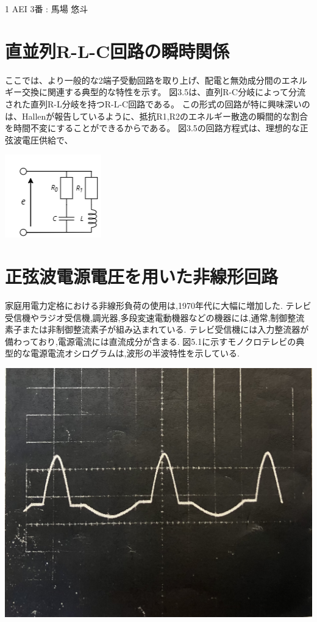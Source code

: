 \documentclass[fleqn,11pt,a4paper,dvipdfmx]{jsarticle}
\begin{document}
%
%
1 AEI 3番 : 馬場 悠斗
\setcounter{section}{2} 
\section{直並列R-L-C回路の瞬時関係}


ここでは、より一般的な2端子受動回路を取り上げ、配電と無効成分間のエネルギー交換に関連する典型的な特性を示す。
図3.5は、直列R-C分岐によって分流された直列R-L分岐を持つR-L-C回路である。
この形式の回路が特に興味深いのは、Hallenが報告しているように、抵抗R1,R2のエネルギー散逸の瞬間的な割合を時間不変にすることができるからである。
図3.5の回路方程式は、理想的な正弦波電圧供給で、

\begin{center}
  \includegraphics[width=0.3\linewidth]{./Circuits/Circuits_Z3_5.png}
  \captionsetup{labelformat=empty} %
\end{center}

\setcounter{section}{4} 
\section{正弦波電源電圧を用いた非線形回路}

家庭用電力定格における非線形負荷の使用は,1970年代に大幅に増加した.
テレビ受信機やラジオ受信機,調光器,多段変速電動機器などの機器には,通常,制御整流素子または非制御整流素子が組み込まれている.
テレビ受信機には入力整流器が備わっており,電源電流には直流成分が含まる.
図5.1に示すモノクロテレビの典型的な電源電流オシログラムは,波形の半波特性を示している.

\begin{center}
  \includegraphics[width=0.3\linewidth]{./Circuits/fig5_1.jpg}
  \captionsetup{labelformat=empty} %
\end{center}
\end{document}
